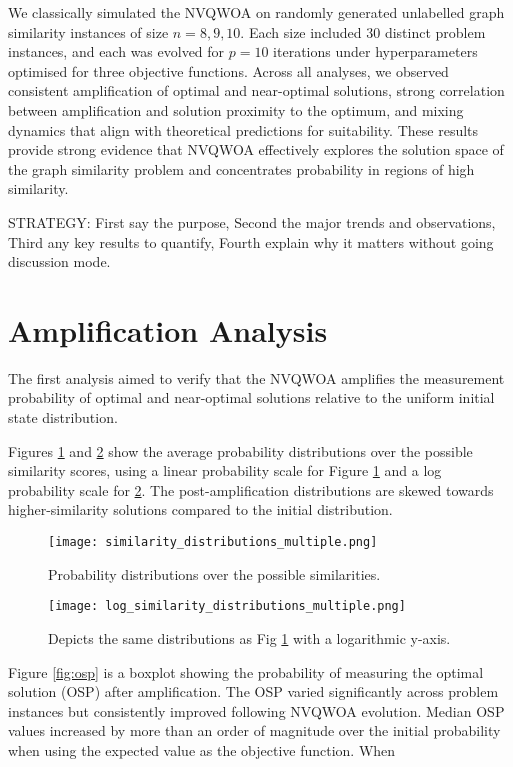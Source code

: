 We classically simulated the NVQWOA on randomly generated unlabelled graph similarity instances of size $n=8,9,10$. Each size included 30 distinct problem instances, and each was evolved for $p=10$ iterations under hyperparameters optimised for three objective functions. Across all analyses, we observed consistent amplification of optimal and near-optimal solutions, strong correlation between amplification and solution proximity to the optimum, and mixing dynamics that align with theoretical predictions for suitability. These results provide strong evidence that NVQWOA effectively explores the solution space of the graph similarity problem and concentrates probability in regions of high similarity.

STRATEGY:
First say the purpose, Second the major trends and observations, Third any key results to quantify, Fourth explain why it matters without going discussion mode.

\section{Amplification Analysis}
The first analysis aimed to verify that the NVQWOA amplifies the measurement probability of optimal and near-optimal solutions relative to the uniform initial state distribution. 

Figures \ref{fig:similarity dist} and \ref{fig:similarity log dist} show the average probability distributions over the possible similarity scores, using a linear probability scale for Figure \ref{fig:similarity dist} and a log probability scale for \ref{fig:similarity log dist}. The post-amplification distributions are skewed towards higher-similarity solutions compared to the initial distribution.


\begin{figure}[htbp]
    \centering
    \texttt{[image: similarity\_distributions\_multiple.png]} 
    \caption{Probability distributions over the possible similarities.}
    \label{fig:similarity dist}
\end{figure}

\begin{figure}[htbp]
    \centering
    \texttt{[image: log\_similarity\_distributions\_multiple.png]} 
    \caption{Depicts the same distributions as Fig \ref{fig:similarity dist} with a logarithmic y-axis.}
    \label{fig:similarity log dist}
\end{figure}

Figure \ref{fig:osp} is a boxplot showing the probability of measuring the optimal solution (OSP) after amplification. The OSP varied significantly across problem instances but consistently improved following NVQWOA evolution. Median OSP values increased by more than an order of magnitude over the initial probability when using the expected value as the objective function. When

